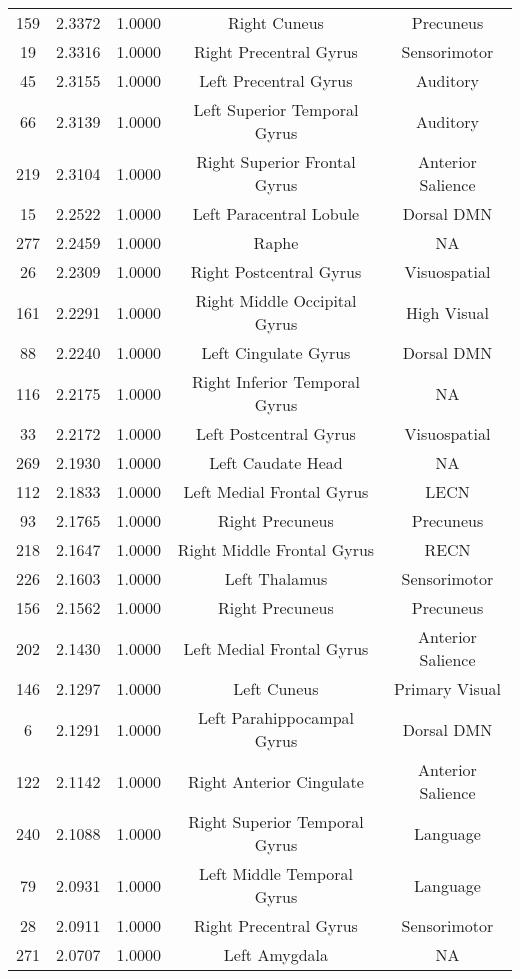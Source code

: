 \documentclass[10pt,letterpaper]{article}\usepackage[]{graphicx}\usepackage[]{color}
\begin{document}
\begin{center}
\begin{longtable}[c]{ccccc}
	159	& 2.3372 & 1.0000 & Right Cuneus & Precuneus \\
	19	& 2.3316 & 1.0000 & Right Precentral Gyrus & Sensorimotor \\
	45	& 2.3155 & 1.0000 & Left Precentral Gyrus & Auditory \\
	66	& 2.3139 & 1.0000 & Left Superior Temporal Gyrus & Auditory \\
	219	& 2.3104 & 1.0000 & Right Superior Frontal Gyrus & Anterior Salience \\
	15	& 2.2522 & 1.0000 & Left Paracentral Lobule & Dorsal DMN \\
	277	& 2.2459 & 1.0000 & Raphe & NA \\
	26	& 2.2309 & 1.0000 & Right Postcentral Gyrus & Visuospatial \\
	161	& 2.2291 & 1.0000 & Right Middle Occipital Gyrus & High Visual \\
	88	& 2.2240 & 1.0000 & Left Cingulate Gyrus & Dorsal DMN \\
	116	& 2.2175 & 1.0000 & Right Inferior Temporal Gyrus & NA \\
	33	& 2.2172 & 1.0000 & Left Postcentral Gyrus & Visuospatial \\
	269	& 2.1930 & 1.0000 & Left Caudate Head & NA \\
	112	& 2.1833 & 1.0000 & Left Medial Frontal Gyrus & LECN \\
	93	& 2.1765 & 1.0000 & Right Precuneus & Precuneus \\
	218	& 2.1647 & 1.0000 & Right Middle Frontal Gyrus & RECN \\
	226	& 2.1603 & 1.0000 & Left Thalamus & Sensorimotor \\
	156	& 2.1562 & 1.0000 & Right Precuneus & Precuneus \\
	202	& 2.1430 & 1.0000 & Left Medial Frontal Gyrus & Anterior Salience \\
	146	& 2.1297 & 1.0000 & Left Cuneus & Primary Visual \\
	6	& 2.1291 & 1.0000 & Left Parahippocampal Gyrus & Dorsal DMN \\
	122	& 2.1142 & 1.0000 & Right Anterior Cingulate & Anterior Salience \\
	240	& 2.1088 & 1.0000 & Right Superior Temporal Gyrus & Language \\
	79	& 2.0931 & 1.0000 & Left Middle Temporal Gyrus & Language \\
	28	& 2.0911 & 1.0000 & Right Precentral Gyrus & Sensorimotor \\
	271	& 2.0707 & 1.0000 & Left Amygdala & NA \\

\end{longtable}
\end{center}
\end{document}
